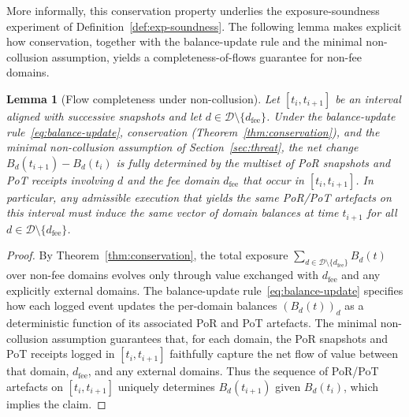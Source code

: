 \documentclass[11pt]{article}
\newtheorem{lemma}{Lemma}
\begin{document}
More informally, this conservation property underlies the exposure-soundness experiment of
Definition~\ref{def:exp-soundness}.  The following lemma makes explicit how conservation,
together with the balance-update rule and the minimal non-collusion assumption, yields a
completeness-of-flows guarantee for non-fee domains.

\begin{lemma}[Flow completeness under non-collusion]
\label{lem:flow-completeness}
Let $[t_i,t_{i+1}]$ be an interval aligned with successive snapshots and let
$d \in \mathcal{D} \setminus \{d_{\mathrm{fee}}\}$.
Under the balance-update rule~\eqref{eq:balance-update}, conservation
(Theorem~\ref{thm:conservation}), and the minimal non-collusion assumption of
Section~\ref{sec:threat}, the net change
$B_d(t_{i+1}) - B_d(t_i)$ is fully determined by the multiset of PoR snapshots and PoT receipts
involving $d$ and the fee domain $d_{\mathrm{fee}}$ that occur in $[t_i,t_{i+1}]$.
In particular, any admissible execution that yields the same PoR/PoT artefacts on this interval
must induce the same vector of domain balances at time $t_{i+1}$ for all
$d \in \mathcal{D} \setminus \{d_{\mathrm{fee}}\}$.
\end{lemma}

\begin{proof}
By Theorem~\ref{thm:conservation}, the total exposure
$\sum_{d \in \mathcal{D} \setminus \{d_{\mathrm{fee}}\}} B_d(t)$
over non-fee domains evolves only through value exchanged with $d_{\mathrm{fee}}$ and any explicitly
external domains.
The balance-update rule~\eqref{eq:balance-update} specifies how each logged event updates the
per-domain balances $(B_d(t))_d$ as a deterministic function of its associated PoR and PoT artefacts.
The minimal non-collusion assumption guarantees that, for each domain, the PoR snapshots and PoT receipts
logged in $[t_i,t_{i+1}]$ faithfully capture the net flow of value between that domain, $d_{\mathrm{fee}}$,
and any external domains.
Thus the sequence of PoR/PoT artefacts on $[t_i,t_{i+1}]$ uniquely determines $B_d(t_{i+1})$ given
$B_d(t_i)$, which implies the claim.
\end{proof}
\end{document}
